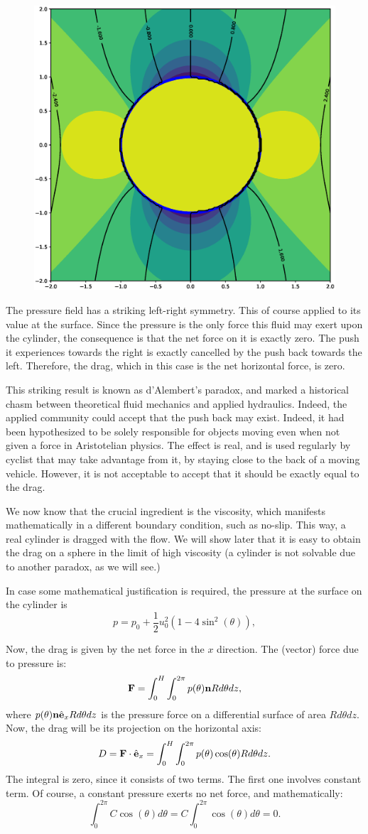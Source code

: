 \begin{figure}
  \centering
  \includegraphics[width=0.4\linewidth]{figures/potential_flow_past_cylinder_phi_p}
  \caption{\label{fig:potential_flow_past_cylinder_phi_p}}
\end{figure}

The pressure field has a striking left-right symmetry. This of course
applied to its value at the surface. Since the pressure is the only
force this fluid may exert upon the cylinder, the consequence is that
the net force on it is exactly zero. The push it experiences towards
the right is exactly cancelled by the push back towards the
left. Therefore, the drag, which in this case is the net horizontal
force, is zero.

This striking result is known as d'Alembert's paradox, and marked a
historical chasm between theoretical fluid mechanics and applied
hydraulics. Indeed, the applied community could accept that the push
back may exist. Indeed, it had been hypothesized to be solely
responsible for objects moving even when not given a force in
Aristotelian physics. The effect is real, and is used regularly by
cyclist that may take advantage from it, by staying close to the back
of a moving vehicle. However, it is not acceptable to accept that it
should be exactly equal to the drag.

We now know that the crucial ingredient is the viscosity, which
manifests mathematically in a different boundary condition, such as
no-slip. This way, a real cylinder is dragged with the flow. We will
show later that it is easy to obtain the drag on a sphere in the limit
of high viscosity (a cylinder is not solvable due to another paradox,
as we will see.)

In case some mathematical justification is required, the pressure
at the surface on the cylinder is
\[
 p= p_0 + \frac12  u_0^2 \left(1 -  4   \sin^2(\theta) \right),
\]

Now, the drag is given by the net force in the $x$ direction. The
(vector) force due to pressure is:
\[
\mathbf{F} = \int_0^H \int_0^{2\pi}   p(\theta)  \mathbf{n}  R d\theta  dz ,
\]
where $p(\theta) \mathbf{n} \hat{\mathbf{e}}_x R d\theta dz $ is the pressure force on a
differential surface of area $ R d\theta dz$. Now, the drag will be
its projection on the horizontal axis:
\[
D= \mathbf{F} \cdot \hat{\mathbf{e}}_x = \int_0^H \int_0^{2\pi}
p(\theta) \cos(\theta) R d\theta dz .
\]
The integral is zero, since it consists of two terms. The first one
involves constant term. Of course, a constant pressure exerts no net
force, and mathematically:
\[
 \int_0^{2\pi} C \cos(\theta) d\theta = C  \int_0^{2\pi}  \cos(\theta) d\theta = 0 .
\]


